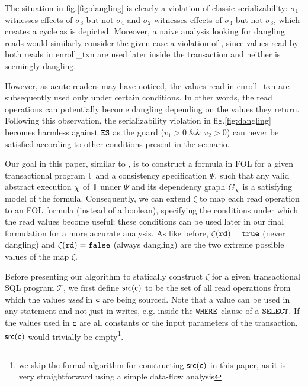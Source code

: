 The situation in fig.\ref{fig:dangling} is clearly a violation of
classic serializability: $\sigma_1$ witnesses effects of
$\sigma_3$ but not $\sigma_4$ and $\sigma_2$ witnesses effects of
$\sigma_4$ but not $\sigma_3$, which creates a cycle as is depicted.
Moreover, a naive analysis looking for dangling reads would similarly
consider the given case a violation of \es, since values read by both reads
in enroll\_txn are used later inside the transaction and neither is seemingly
dangling. 

However, as acute readers may have noticed, 
the values read in enroll\_txn are subsequently used only under certain conditions.
In other words, the read operations can potentially become dangling
depending on the values they return. Following this observation, the
serializability violation in fig.\ref{fig:dangling} becomes harmless against $\texttt{ES}$ as the
guard ($v_1>0 \;\&\&\; v_2>0 $) can never be satisfied according to other
conditions present in the scenario.


Our goal in this paper, similar to \cite{Nagar:ser}, is to
construct a formula in FOL for a 
given transactional program $\mathbb{T}$ and a consistency
specification $\Psi$, such that any valid abstract execution
$\chi$ of $\mathbb{T}$ under $\Psi$ 
and its dependency
graph $G_\chi$ is a satisfying model of the formula. Consequently, we
can extend $\zeta$ to map each read operation to an FOL formula
(instead of a boolean), specifying the
conditions under which the read values become useful; 
these conditions
can be used later in our final formulation for a more accurate
analysis. 
As like before, $\mathtt{\zeta}(\texttt{rd})=\texttt{true}$ (never dangling) and 
$\mathtt{\zeta}(\texttt{rd})=\texttt{false}$ (always dangling) are the 
two extreme possible values of the map $\zeta$.

Before presenting our algorithm to statically construct $\zeta$
for a given transactional SQL program $\mathcal{T}$, we first define $\mathsf{src}(\mathsf{c})$ to be the set
of all read operations from which the values \emph{used} in $\mathsf{c}$ are being sourced. 
Note that a value can be used in any statement and not just in writes, e.g. inside the 
$\mathtt{WHERE}$ clause of a $\mathtt{SELECT}$.
If the values used in $\mathsf{c}$ are all constants or 
the input parameters of the transaction,
$\mathsf{src(\mathsf{c})}$ would trivially be empty\footnote{
we skip the formal algorithm for
 constructing $\mathsf{src(\mathsf{c})}$ in this paper,
as it is very straightforward using a simple data-flow analysis}.


